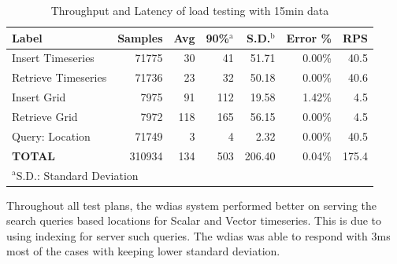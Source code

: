 \documentclass[conference]{IEEEtran}
\begin{document}
\begin{table}[htbp]
\caption{ Throughput and Latency of load testing with 15min data}
\begin{center}
\begin{adjustbox}{width=0.45\textwidth}
\begin{tabular}{|l|r|r|r|r|r|r|}
\hline
\textbf{Label} & \textbf{Samples} & \textbf{Avg} & \textbf{90\%$^{\mathrm{a}}$} & \textbf{S.D.$^{\mathrm{b}}$} & \textbf{Error \%} & \textbf{RPS} \\ \hline
Insert Timeseries & 71775 & 30 & 41 & 51.71 & 0.00\% & 40.5 \\ \hline
Retrieve Timeseries & 71736 & 23 & 32 & 50.18 & 0.00\% & 40.6 \\ \hline
Insert Grid & 7975 & 91 & 112 & 19.58 & 1.42\% & 4.5 \\ \hline
Retrieve Grid & 7972 & 118 & 165 & 56.15 & 0.00\% & 4.5 \\ \hline
Query: Location & 71749 & 3 & 4 & 2.32 & 0.00\% & 40.5 \\ \hline
\textbf{TOTAL} & 310934 & 134 & 503 & 206.40 & 0.04\% & 175.4 \\ \hline
\multicolumn{4}{l}{$^{\mathrm{a}}$S.D.: Standard Deviation}{$^{\mathrm{b}}$90\%: 90\% percentile}
\end{tabular}
\end{adjustbox}
\label{ptab:obs_all_15_min_summary_throughput}
\end{center}
\end{table}

Throughout all test plans, the \acrshort{wdias} system performed better on serving the search queries based locations for Scalar and Vector timeseries. This is due to using indexing for server such queries. The \acrshort{wdias} was able to respond with 3ms most of the cases with keeping lower standard deviation.
\end{document}

